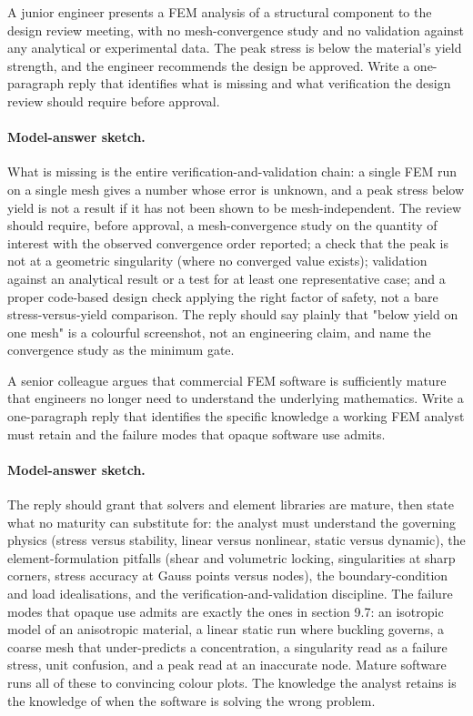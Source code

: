 \begin{exercise}
A junior engineer presents a FEM analysis of a structural
component to the design review meeting, with no mesh-convergence
study and no validation against any analytical or experimental
data. The peak stress is below the material's yield strength,
and the engineer recommends the design be approved. Write a
one-paragraph reply that identifies what is missing and what
verification the design review should require before approval.

\paragraph{Model-answer sketch.} What is missing is the entire
verification-and-validation chain: a single FEM run on a single mesh
gives a number whose error is unknown, and a peak stress below yield is
not a result if it has not been shown to be mesh-independent. The
review should require, before approval, a mesh-convergence study on the
quantity of interest with the observed convergence order reported; a
check that the peak is not at a geometric singularity (where no
converged value exists); validation against an analytical result or a
test for at least one representative case; and a proper code-based
design check applying the right factor of safety, not a bare
stress-versus-yield comparison. The reply should say plainly that
"below yield on one mesh" is a colourful screenshot, not an engineering
claim, and name the convergence study as the minimum gate.
\end{exercise}

\begin{exercise}
A senior colleague argues that commercial FEM software is
sufficiently mature that engineers no longer need to understand
the underlying mathematics. Write a one-paragraph reply that
identifies the specific knowledge a working FEM analyst must
retain and the failure modes that opaque software use admits.

\paragraph{Model-answer sketch.} The reply should grant that solvers
and element libraries are mature, then state what no maturity can
substitute for: the analyst must understand the governing physics
(stress versus stability, linear versus nonlinear, static versus
dynamic), the element-formulation pitfalls (shear and volumetric
locking, singularities at sharp corners, stress accuracy at Gauss
points versus nodes), the boundary-condition and load idealisations,
and the verification-and-validation discipline. The failure modes that
opaque use admits are exactly the ones in section 9.7: an isotropic
model of an anisotropic material, a linear static run where buckling
governs, a coarse mesh that under-predicts a concentration, a
singularity read as a failure stress, unit confusion, and a peak read
at an inaccurate node. Mature software runs all of these to convincing
colour plots. The knowledge the analyst retains is the knowledge of
when the software is solving the wrong problem.
\end{exercise}

